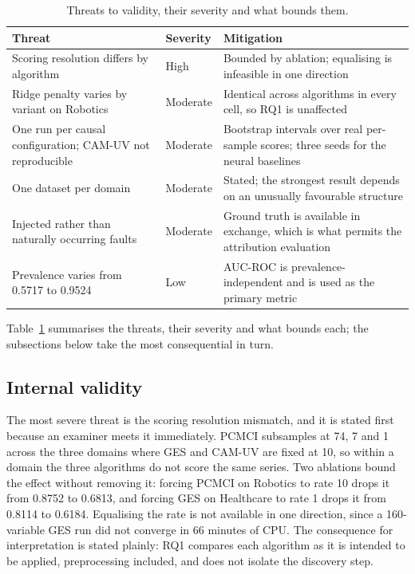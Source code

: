 \begin{table}[htbp]
\centering
\small
\setlength{\tabcolsep}{4pt}
\caption{Threats to validity, their severity and what bounds them.}
\label{tab:threats}
\begin{tabularx}{\textwidth}{@{}p{} l X@{}}
\toprule
Threat & Severity & Mitigation \\
\midrule
Scoring resolution differs by algorithm & High & Bounded by ablation; equalising is infeasible in one direction \\
Ridge penalty varies by variant on Robotics & Moderate & Identical across algorithms in every cell, so RQ1 is unaffected \\
One run per causal configuration; CAM-UV not reproducible & Moderate & Bootstrap intervals over real per-sample scores; three seeds for the neural baselines \\
One dataset per domain & Moderate & Stated; the strongest result depends on an unusually favourable structure \\
Injected rather than naturally occurring faults & Moderate & Ground truth is available in exchange, which is what permits the attribution evaluation \\
Prevalence varies from 0.5717 to 0.9524 & Low & AUC-ROC is prevalence-independent and is used as the primary metric \\
\bottomrule
\end{tabularx}
\end{table}

Table~\ref{tab:threats} summarises the threats, their severity and what bounds each; the subsections below take the most consequential in turn.

\subsection{Internal validity}

The most severe threat is the scoring resolution mismatch, and it is stated first because an examiner meets it immediately. PCMCI subsamples at 74, 7 and 1 across the three domains where GES and CAM-UV are fixed at 10, so within a domain the three algorithms do not score the same series. Two ablations bound the effect without removing it: forcing PCMCI on Robotics to rate 10 drops it from 0.8752 to 0.6813, and forcing GES on Healthcare to rate 1 drops it from 0.8114 to 0.6184. Equalising the rate is not available in one direction, since a 160-variable GES run did not converge in 66 minutes of CPU. The consequence for interpretation is stated plainly: RQ1 compares each algorithm as it is intended to be applied, preprocessing included, and does not isolate the discovery step.

